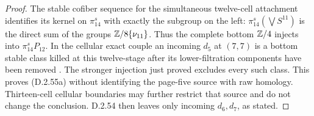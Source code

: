 \begin{proof}
The stable cofiber sequence for the simultaneous
twelve-cell attachment identifies its kernel on
$\pi_{14}^s$ with exactly the subgroup on the left:
$\pi_{14}^s(\bigvee S^{11})$ is the direct sum of
the groups $\mathbb Z/8\{\nu_{11}\}$.
Thus the complete bottom $\mathbb Z/4$ injects into
$\pi_{14}^sP_{12}$.
In the cellular exact couple an incoming $d_5$ at
$(7,7)$ is a bottom stable class killed at this
twelve-stage after its lower-filtration components
have been removed
\cite[Part III, Section 7]{EH5Adams1974AHSS}.
The stronger injection just proved excludes every
such class.  This proves \textup{(D.2.55a)} without
identifying the page-five source with raw homology.
Thirteen-cell cellular boundaries may further
restrict that source and do not change the conclusion.
D.2.54 then leaves only incoming $d_6,d_7$, as stated.
\end{proof}
